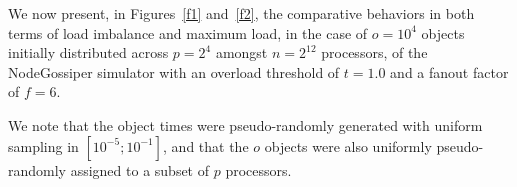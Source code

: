 We now present, in Figures~\ref{f1} and~\ref{f2}, the comparative behaviors in
both terms of load imbalance and maximum load, in the case of $o=10^4$
objects initially distributed across $p=2^4$ amongst $n=2^{12}$
processors, of the \textsf{NodeGossiper} simulator with an overload
threshold of $t=1.0$ and a fanout factor of $f=6$.

We note that the object times were pseudo-randomly generated with uniform
sampling in $[10^{-5};10^{-1}]$, and that the $o$ objects were also
uniformly pseudo-randomly assigned to a subset of $p$ processors.